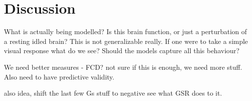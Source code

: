 \documentclass[oneside]{./zHenriquesLab-StyleBioRxiv}
\begin{document}
\section*{Discussion}

What is actually being modelled? Is this brain function, or just a perturbation of a resting idled brain? This is not generalizable really. If one were to take a simple visual response what do we see? Should the models capture all this behaviour?

We need better measures - FCD? not sure if this is enough, we need more stuff. Also need to have predictive validity. 


also idea, shift the last few Gs stuff to negative see what GSR does to it.
\end{document}

